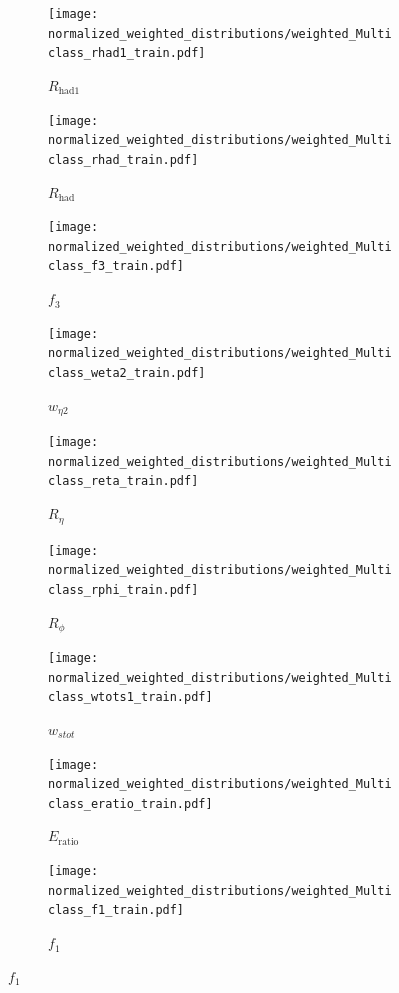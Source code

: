 \begin{figure}[htbp]
  \centering
  \begin{subfigure}[b]{0.30\textwidth}
      \centering
      \texttt{[image: normalized\_weighted\_distributions/weighted\_Multiclass\_rhad1\_train.pdf]}
      \caption{$R_{\text{had1}}$}
      \label{fig:input1}
  \end{subfigure}
  \hfill
  \begin{subfigure}[b]{0.30\textwidth}
      \centering
      \texttt{[image: normalized\_weighted\_distributions/weighted\_Multiclass\_rhad\_train.pdf]}
      \caption{$R_{\text{had}}$}
      \label{fig:input2}
  \end{subfigure}
  \hfill
  \begin{subfigure}[b]{0.30\textwidth}
      \centering
      \texttt{[image: normalized\_weighted\_distributions/weighted\_Multiclass\_f3\_train.pdf]}
      \caption{$f_3$}
      \label{fig:input3}
  \end{subfigure}

  \vspace{0.4cm}
  \begin{subfigure}[b]{0.30\textwidth}
      \centering
      \texttt{[image: normalized\_weighted\_distributions/weighted\_Multiclass\_weta2\_train.pdf]}
      \caption{$w_{\eta2}$}
      \label{fig:input4}
  \end{subfigure}
  \hfill
  \begin{subfigure}[b]{0.30\textwidth}
      \centering
      \texttt{[image: normalized\_weighted\_distributions/weighted\_Multiclass\_reta\_train.pdf]}
      \caption{$R_{\eta}$}
      \label{fig:input5}
  \end{subfigure}
  \hfill
  \begin{subfigure}[b]{0.30\textwidth}
      \centering
      \texttt{[image: normalized\_weighted\_distributions/weighted\_Multiclass\_rphi\_train.pdf]}
      \caption{$R_{\phi}$}
      \label{fig:input6}
  \end{subfigure}

  \vspace{0.4cm}
  \begin{subfigure}[b]{0.30\textwidth}
      \centering
      \texttt{[image: normalized\_weighted\_distributions/weighted\_Multiclass\_wtots1\_train.pdf]}
      \caption{$w_{stot}$}
      \label{fig:input7}
  \end{subfigure}
  \hfill
  \begin{subfigure}[b]{0.30\textwidth}
      \centering
      \texttt{[image: normalized\_weighted\_distributions/weighted\_Multiclass\_eratio\_train.pdf]}
      \caption{$E_{\text{ratio}}$}
      \label{fig:input8}
  \end{subfigure}
  \hfill
  \begin{subfigure}[b]{0.30\textwidth}
      \centering
      \texttt{[image: normalized\_weighted\_distributions/weighted\_Multiclass\_f1\_train.pdf]}
      \caption{$f_1$}
      \label{fig:input9}
  \end{subfigure}


\end{figure}
